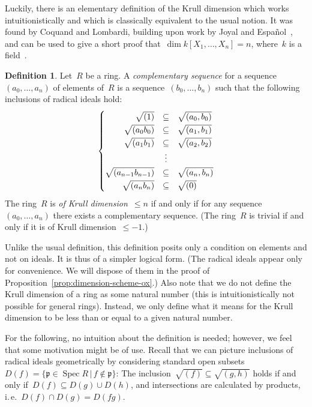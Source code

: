 \documentclass[10pt,reqno,a4paper]{amsbook}
\makeatletter
\theoremstyle{definition}
\newtheorem{defn}{Definition}[section]
\theoremstyle{plain}
\theoremstyle{remark}
\newcommand{\ppp}{\mathfrak{p}}
\DeclareMathOperator{\Spec}{Spec}
\newcommand{\?}{\,{:}\,}
\renewcommand{\_}{\mathpunct{.}\,}
\newcommand{\ie}{i.\,e.\@\xspace}
\makeatother
\begin{document}
Luckily, there is an elementary definition of the Krull dimension which works
intuitionistically and which is classically equivalent to the usual notion. It
was found by Coquand and Lombardi, building upon work by
Joyal and Español~\cite{dyn:krull-integral,dyn:char-krull}, and can be
used to give a short proof that~$\dim k[X_1,\ldots,X_n] = n$, where~$k$ is a
field~\cite{dyn:krull-dim-polynomial-ring}.

\begin{defn}Let~$R$ be a ring. A \emph{complementary sequence} for a
sequence~$(a_0,\ldots,a_n)$ of elements of~$R$ is a sequence~$(b_0,\ldots,b_n)$
such that the following inclusions of radical ideals hold:
\[ \renewcommand{\arraystretch}{1.3}
\left\{\begin{array}{@{}rcl@{}}
  \sqrt{(1)} &\subseteq& \sqrt{(a_0,b_0)} \\
  \sqrt{(a_0 b_0)} &\subseteq& \sqrt{(a_1,b_1)} \\
  \sqrt{(a_1 b_1)} &\subseteq& \sqrt{(a_2,b_2)} \\
  &\vdots \\
  \sqrt{(a_{n-1} b_{n-1})} &\subseteq& \sqrt{(a_n,b_n)} \\
  \sqrt{(a_n b_n)} &\subseteq& \sqrt{(0)}
\end{array}\right. \]
The ring~$R$ is \emph{of Krull dimension~$\leq n$} if
and only if for any sequence~$(a_0,\ldots,a_n)$ there exists a
complementary sequence. (The ring~$R$ is trivial if and only if it is
of Krull dimension~$\leq -1$.)
\end{defn}
Unlike the usual definition, this definition posits only a condition
on elements and not on ideals. It is thus of a simpler logical form.
(The radical ideals appear only for convenience. We will dispose of them in the
proof of Proposition~\ref{prop:dimension-scheme-ox}.)
Also note that we do not define the Krull dimension of a ring as some natural
number (this is intuitionistically not possible for general rings). Instead, we
only define what it means for the Krull dimension to be less than or equal to
a given natural number.

For the following, no intuition about the definition is needed; however, we
feel that some motivation might be of use. Recall that we can picture inclusions of
radical ideals geometrically by considering standard open subsets~$D(f) = \{
\ppp \in \Spec R \,|\, f \not\in \ppp \}$: The inclusion~$\sqrt{(f)} \subseteq
\sqrt{(g,h)}$ holds if and only if~$D(f) \subseteq D(g) \cup D(h)$, and
intersections are calculated by products, \ie~$D(f) \cap D(g) = D(fg)$.
\end{document}
